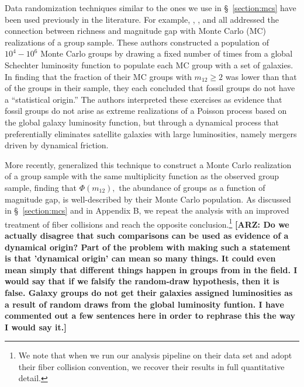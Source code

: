\documentclass[usenatbib,usegraphicx,letterpaper]{mn2e}
\newcommand{\monetwo}{m_{12}}
\begin{document}
Data randomization techniques similar to the ones we use in
\S~\ref{section:mcs} have been used previously in the literature. For
example, \citet{jones_etal03}, \citet{dariush_etal07}, and
\citet{tavasoli_etal11} all addressed the connection between richness
and magnitude gap with Monte Carlo (MC) realizations of a group
sample. These authors constructed a population of $10^{4}-10^{6}$
Monte Carlo groups by drawing a fixed number of times from a global
Schechter luminosity function to populate each MC group with a set of
galaxies. In finding that the fraction of their MC groups with
$\monetwo \geq 2$ was lower than that of the groups in their sample,
they each concluded that fossil groups do not 
have a ``statistical origin.''  The authors interpreted 
these exercises as evidence that fossil groups do not arise 
as extreme realizations of a Poisson process based on the global 
galaxy luminosity function, but through a 
dynamical process that preferentially eliminates satellite 
galaxies with large luminosities, namely mergers driven 
by dynamical friction.


More recently, \citet{paranjape_sheth11} generalized this technique to
construct a Monte Carlo realization of a group sample with the same
multiplicity function as the observed group sample, finding that
$\Phi(\monetwo),$ the abundance of groups as a function of magnitude
gap, is well-described by their Monte Carlo population. As discussed
in \S~\ref{section:mcs} and in Appendix B, we repeat the
\citet{paranjape_sheth11} analysis with an improved treatment of fiber
collisions and reach the opposite conclusion.\footnote{We note that
when we run our analysis pipeline on their data set and adopt their
fiber collision convention, we recover their results in full
quantitative detail.} {\bf [ARZ: Do we actually disagree that 
such comparisons can be used as evidence of a dynamical origin? 
Part of the problem with making such a statement is that 
'dynamical origin' can mean so many things. It could even 
mean simply that different things happen in groups from 
in the field.   
I would say that if we falsify the random-draw hypothesis, 
then it is false.  Galaxy groups do not get their galaxies 
assigned luminosities as a result of random draws from the global 
luminosity funtion.  I have commented out a few sentences here 
in order to rephrase this the way I would say it.]}
%
%
\end{document}
